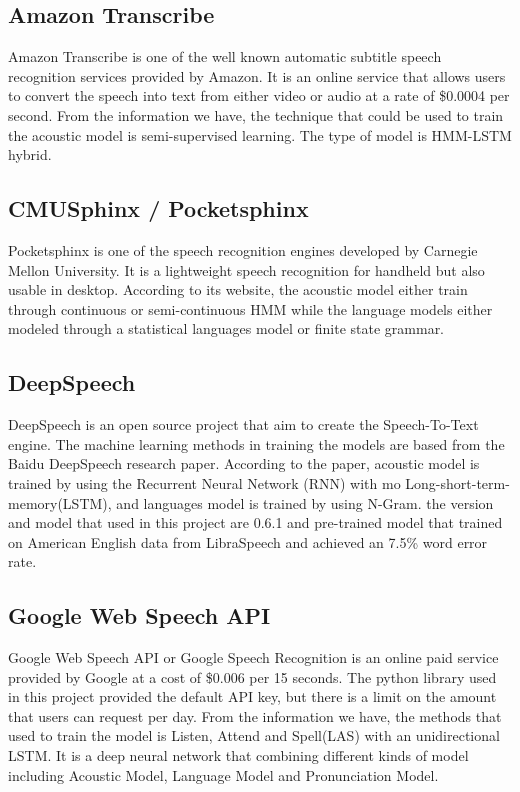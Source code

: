 \documentclass[natbib]{muthesis}
\begin{document}
  \subsection{Amazon Transcribe}
  Amazon Transcribe is one of the well known automatic subtitle speech recognition services provided by Amazon. It is an online service that allows users to convert the speech into text from either video or audio at a rate of \$0.0004 per second. From the information we have, the technique that could be used to train the acoustic model is semi-supervised learning. The type of model is HMM-LSTM hybrid.\cite{parthasarathi2019lessons}
  \subsection{CMUSphinx / Pocketsphinx}
  Pocketsphinx is one of the speech recognition engines developed by Carnegie Mellon University. It is a lightweight speech recognition for handheld but also usable in desktop. According to its website, the acoustic model either train through continuous or semi-continuous HMM while the language models either modeled through a statistical languages model or finite state grammar.\cite{CMUSphinxModels} 
  
  \subsection{DeepSpeech}
  DeepSpeech is an open source project that aim to create the Speech-To-Text engine. The machine learning methods in training the models are based from the Baidu DeepSpeech research paper. According to the paper, acoustic model is trained by using the Recurrent Neural Network (RNN) with mo Long-short-term-memory(LSTM), and languages model is trained by using N-Gram\cite{hannun2014deep}.
  the version and model that used in this project are 0.6.1 and pre-trained model that trained on American English data from LibraSpeech and achieved an 7.5\% word error rate. 
  \subsection{Google Web Speech API}
  Google Web Speech API or Google Speech Recognition is an online paid service provided by Google at a cost of \$0.006 per 15 seconds. The python library used in this project provided the default API key, but there is a limit on the amount that users can request per day. From the information we have, the methods that used to train the model is Listen, Attend and Spell(LAS) with an unidirectional LSTM.\cite{46687} It is a deep neural network that combining different kinds of model including Acoustic Model, Language Model and Pronunciation Model.
\end{document}
